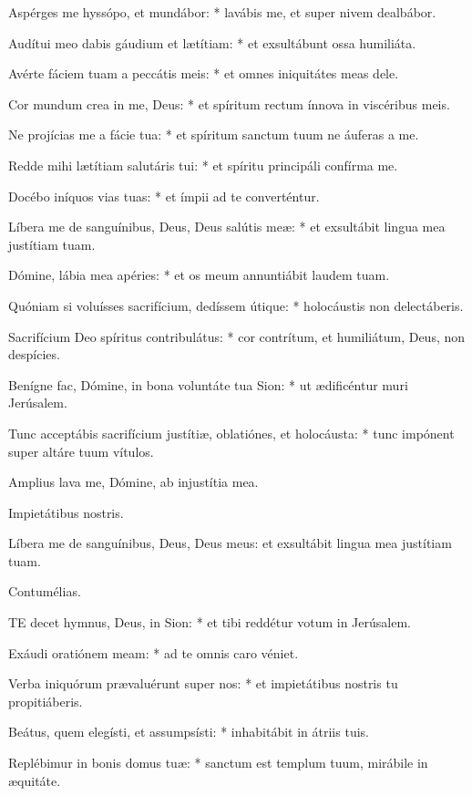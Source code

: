 Aspérges me hyssópo, et mundábor: * lavábis me, et super nivem dealbábor.

Audítui meo dabis gáudium et lætítiam: * et exsultábunt ossa humiliáta.

Avérte fáciem tuam a peccátis meis: * et omnes iniquitátes meas dele.

Cor mundum crea in me, Deus: * et spíritum rectum ínnova in viscéribus meis.

Ne projícias me a fácie tua: * et spíritum sanctum tuum ne áuferas a me.

Redde mihi lætítiam salutáris tui: * et spíritu principáli confírma me.

Docébo iníquos vias tuas: * et ímpii ad te converténtur.

Líbera me de sanguínibus, Deus, Deus salútis meæ: * et exsultábit lingua mea justítiam tuam.

Dómine, lábia mea apéries: * et os meum annuntiábit laudem tuam.

Quóniam si voluísses sacrifícium, dedíssem útique: * holocáustis non delectáberis.

Sacrifícium Deo spíritus contribulátus: * cor contrítum, et humiliátum, Deus, non despícies.

Benígne fac, Dómine, in bona voluntáte tua Sion: * ut ædificéntur muri Jerúsalem.

Tunc acceptábis sacrifícium justítiæ, oblatiónes, et holocáusta: * tunc impónent super altáre tuum vítulos.

 Amplius lava me, Dómine, ab injustítia mea.

 Impietátibus nostris.


 Líbera me de sanguínibus, Deus, Deus meus: et exsultábit lingua mea justítiam tuam.

 Contumélias.


\lettrine[lines=2]{T}{E} decet hymnus, Deus, in Sion: * et tibi reddétur votum in Jerúsalem.

Exáudi oratiónem meam: * ad te omnis caro véniet.

Verba iniquórum prævaluérunt super nos: * et impietátibus nostris tu propitiáberis.

Beátus, quem elegísti, et assumpsísti: * inhabitábit in átriis tuis.

Replébimur in bonis domus tuæ: * sanctum est templum tuum, mirábile in æquitáte.

